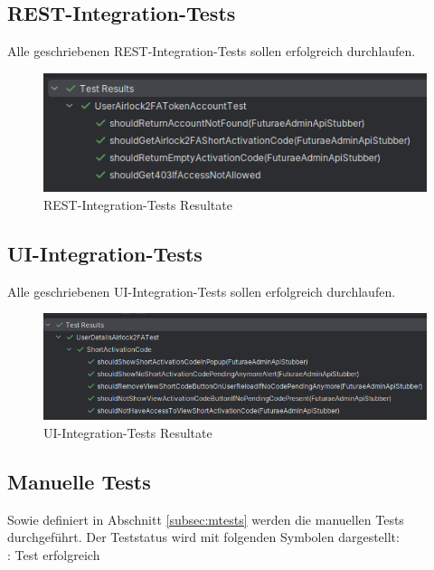 \subsection{REST-Integration-Tests}
Alle geschriebenen REST-Integration-Tests sollen erfolgreich durchlaufen.
\begin{figure}[H]
	\begin{center}
		\includegraphics[width=1.0\textwidth]{ressourcen/resttest}
		\caption[REST-Integration-Tests Resultate]{REST-Integration-Tests Resultate}\label{fig:rest-tests}
	\end{center}
\end{figure}
\subsection{UI-Integration-Tests}
Alle geschriebenen UI-Integration-Tests sollen erfolgreich durchlaufen.
\begin{figure}[H]
	\begin{center}
		\includegraphics[width=1.1\textwidth]{ressourcen/uitests}
		\caption[UI-Integration-Tests Resultate]{UI-Integration-Tests Resultate}\label{fig:ui-tests}
	\end{center}
\end{figure}
\subsection{Manuelle Tests}
Sowie definiert in Abschnitt \ref{subsec:mtests} werden die manuellen Tests durchgeführt. Der Teststatus wird mit folgenden Symbolen dargestellt:\\

\textcolor{green}{\checkmark}: Test erfolgreich \\

